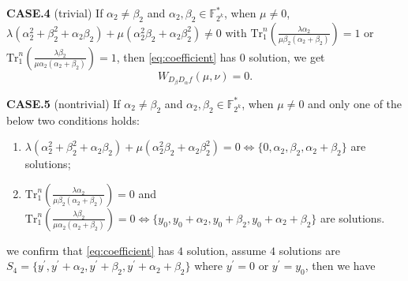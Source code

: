 \documentclass[runningheads,a4paper]{article}
\newcommand{\F}{\mathbb{F}}
\newcommand{\0}{\textbf{0}}
\newcommand{\1}{\textbf{1}}
\renewcommand{\Tr}{\mathrm{Tr}_1^n}
\begin{document}
    \textbf{CASE.4} (trivial) If $ \alpha_2\ne\beta_2 $ and $ \alpha_2,\beta_2\in\F_{2^k}^* $, when $ \mu\ne 0 $, 
    $ \lambda(\alpha_2^2+\beta_2^2+\alpha_2\beta_2)+\mu(\alpha_2^2\beta_2+\alpha_2\beta_2^2)\ne 0 $ with $ \Tr\left(\frac{\lambda\alpha_2}{\mu\beta_2(\alpha_2+\beta_2)}\right)=1 $ or $ \Tr\left(\frac{\lambda\beta_2}{\mu\alpha_2(\alpha_2+\beta_2)}\right)=1 $, 
    then \eqref{eq:coefficient} has $ 0 $ solution, we get 
    \[ W_{D_{\beta}D_{\alpha}f}(\mu,\nu)=0. \]

    \textbf{CASE.5} (nontrivial) If $ \alpha_2\ne\beta_2 $ and $ \alpha_2,\beta_2\in\F_{2^k}^* $, 
    when $ \mu\ne 0 $ and only one of the below two conditions holds:  
    \begin{enumerate}[label=\arabic{*})]
        \item $ \lambda(\alpha_2^2+\beta_2^2+\alpha_2\beta_2)+\mu(\alpha_2^2\beta_2+\alpha_2\beta_2^2)= 0 \Leftrightarrow \{0,\alpha_2,\beta_2,\alpha_2+\beta_2\}$ are solutions; 
        \item $ \Tr\left(\frac{\lambda\alpha_2}{\mu\beta_2(\alpha_2+\beta_2)}\right)=0 $ and $ \Tr\left(\frac{\lambda\beta_2}{\mu\alpha_2(\alpha_2+\beta_2)}\right)=0 \Leftrightarrow\{y_0,y_0+\alpha_2,y_0+\beta_2,y_0+\alpha_2+\beta_2\} $ are solutions.
    \end{enumerate}
    we confirm that \eqref{eq:coefficient} has $ 4 $ solution, assume $ 4 $ solutions are 
    $ S_4=\{y^{\prime},y^{\prime}+\alpha_2,y^{\prime}+\beta_2,y^{\prime}+\alpha_2+\beta_2\} $ 
    where $ y^{\prime}=0 $ or  $ y^{\prime}=y_0 $, then we have 
\end{document}
